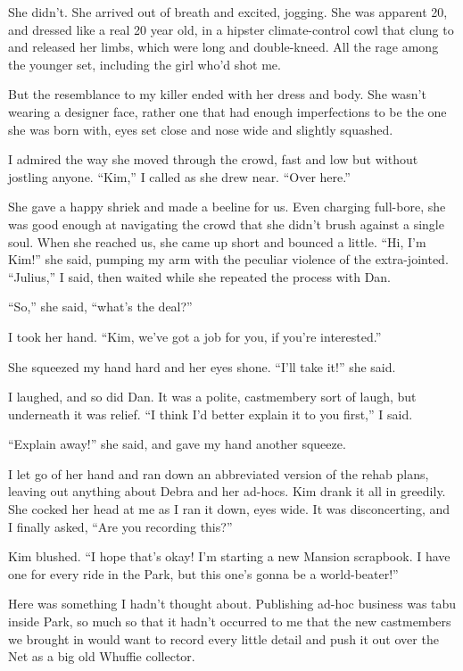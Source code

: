 She didn't. She arrived out of breath and excited, jogging. She was
apparent 20, and dressed like a real 20 year old, in a hipster
climate-control cowl that clung to and released her limbs, which
were long and double-kneed. All the rage among the younger set,
including the girl who'd shot me.

But the resemblance to my killer ended with her dress and body. She
wasn't wearing a designer face, rather one that had enough
imperfections to be the one she was born with, eyes set close and
nose wide and slightly squashed.

I admired the way she moved through the crowd, fast and low but
without jostling anyone. “Kim,” I called as she drew near. “Over
here.”

She gave a happy shriek and made a beeline for us. Even charging
full-bore, she was good enough at navigating the crowd that she
didn't brush against a single soul. When she reached us, she came
up short and bounced a little. “Hi, I'm Kim!” she said, pumping my
arm with the peculiar violence of the extra-jointed. “Julius,” I
said, then waited while she repeated the process with Dan.

“So,” she said, “what's the deal?”

I took her hand. “Kim, we've got a job for you, if you're
interested.”

She squeezed my hand hard and her eyes shone. “I'll take it!” she
said.

I laughed, and so did Dan. It was a polite, castmembery sort of
laugh, but underneath it was relief. “I think I'd better explain it
to you first,” I said.

“Explain away!” she said, and gave my hand another squeeze.

I let go of her hand and ran down an abbreviated version of the
rehab plans, leaving out anything about Debra and her ad-hocs. Kim
drank it all in greedily. She cocked her head at me as I ran it
down, eyes wide. It was disconcerting, and I finally asked, “Are
you recording this?”

Kim blushed. “I hope that's okay! I'm starting a new Mansion
scrapbook. I have one for every ride in the Park, but this one's
gonna be a world-beater!”

Here was something I hadn't thought about. Publishing ad-hoc
business was tabu inside Park, so much so that it hadn't occurred
to me that the new castmembers we brought in would want to record
every little detail and push it out over the Net as a big old
Whuffie collector.

